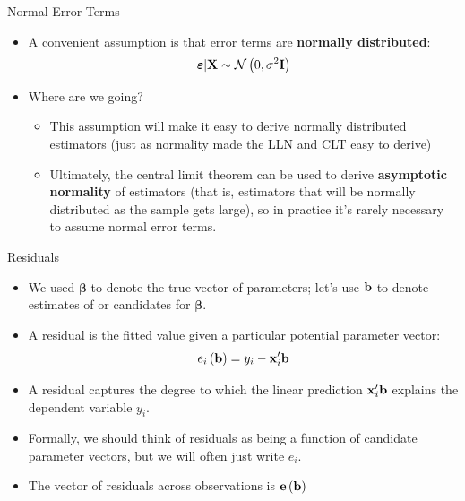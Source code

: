 \documentclass[english,xcolor={dvipsnames},aspectratio=169]{beamer}
\begin{document}
\begin{frame}{Normal Error Terms}
\begin{itemize}
	\item A convenient assumption 
	 is that error terms are {\bf normally distributed}:\[
		\boldsymbol{\varepsilon} | {\bf X} \sim \mathcal{N}\left(0,\sigma^2 {\bf I}\right)
	\]

	\medskip
	\item Where are we going?
	\begin{itemize}
		\item This assumption will make it easy to derive normally distributed estimators (just as
			normality made the LLN and CLT easy to derive)
		\item Ultimately, the central limit theorem can be used to derive {\bf asymptotic normality}
				of estimators (that is, estimators that will be normally distributed as the sample gets large),
				so in practice it's rarely necessary to assume normal error terms. 
	\end{itemize}

\end{itemize}
\end{frame}



\begin{frame}{Residuals}
\begin{itemize}
	\item We used $\boldsymbol{\beta}$ to denote the true vector of parameters; let's use
	${\bf b}$ to denote estimates of or candidates for $\boldsymbol{\beta}$.

	\item A residual is the fitted value given a particular potential parameter vector:\[
		e_i \left({\bf b}\right) = y_i - {\bf x}_i' {\bf b}
	\]

	\item A residual captures the degree to which the linear prediction ${\bf x}_i' {\bf b}$
	explains the dependent variable $y_{i}$.
	

	\item Formally, we should think of residuals as being a function of candidate parameter
	vectors, but we will often just write $e_i$. 


	\item The vector of residuals across observations is ${\bf e} \left({\bf b}\right)$
\end{itemize}
\end{frame}
\end{document}
